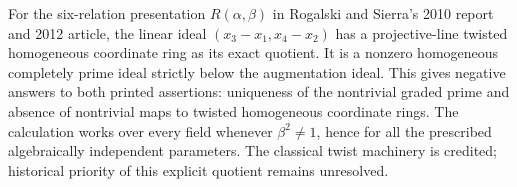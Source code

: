 For the six-relation presentation \(R(\alpha,\beta)\) in Rogalski and
Sierra's 2010 report and 2012 article, the linear ideal
\((x_3-x_1,x_4-x_2)\) has a projective-line twisted homogeneous coordinate
ring as its exact quotient. It is a nonzero homogeneous completely prime
ideal strictly below the augmentation ideal. This gives negative answers
to both printed assertions: uniqueness of the nontrivial graded prime
and absence of nontrivial maps to twisted homogeneous coordinate rings.
The calculation works over every field whenever \(\beta^2\ne1\), hence
for all the prescribed algebraically independent parameters.
The classical twist machinery is credited; historical priority of this
explicit quotient remains unresolved.
